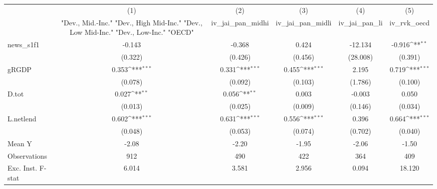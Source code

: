 {
\def\sym#1{\ifmmode^{#1}\else\(^{#1}\)\fi}
\begin{tabular}{l*{5}{c}}
\toprule
            &\multicolumn{1}{c}{(1)}&\multicolumn{1}{c}{(2)}&\multicolumn{1}{c}{(3)}&\multicolumn{1}{c}{(4)}&\multicolumn{1}{c}{(5)}\\
            &\multicolumn{1}{c}{ "Dev., Mid.-Inc." "Dev., High Mid-Inc." "Dev., Low Mid-Inc." "Dev., Low-Inc." "OECD" }&\multicolumn{1}{c}{iv\_jai\_pan\_midhi}&\multicolumn{1}{c}{iv\_jai\_pan\_midli}&\multicolumn{1}{c}{iv\_jai\_pan\_li}&\multicolumn{1}{c}{iv\_rvk\_oecd}\\
\midrule
news\_s1f1   &      -0.143         &      -0.368         &       0.424         &     -12.134         &      -0.916\sym{**} \\
            &     (0.322)         &     (0.426)         &     (0.456)         &    (28.008)         &     (0.391)         \\
\addlinespace
gRGDP       &       0.353\sym{***}&       0.331\sym{***}&       0.455\sym{***}&       2.195         &       0.719\sym{***}\\
            &     (0.078)         &     (0.092)         &     (0.103)         &     (1.786)         &     (0.100)         \\
\addlinespace
D.tot       &       0.027\sym{**} &       0.056\sym{**} &       0.003         &      -0.003         &       0.050         \\
            &     (0.013)         &     (0.025)         &     (0.009)         &     (0.146)         &     (0.034)         \\
\addlinespace
L.netlend   &       0.602\sym{***}&       0.631\sym{***}&       0.556\sym{***}&       0.396         &       0.664\sym{***}\\
            &     (0.048)         &     (0.053)         &     (0.074)         &     (0.702)         &     (0.040)         \\
\midrule
Mean Y      &       -2.08         &       -2.20         &       -1.95         &       -2.06         &       -1.50         \\
Observations&         912         &         490         &         422         &         364         &         409         \\
Exc. Inst. F-stat&       6.014         &       3.581         &       2.956         &       0.094         &      18.120         \\
\bottomrule
\end{tabular}
}
